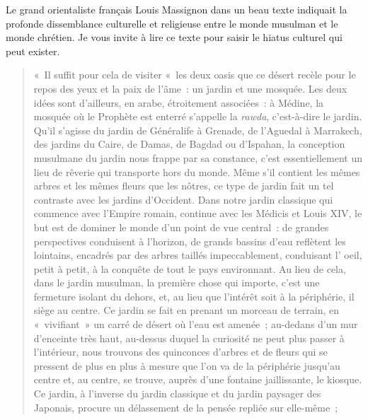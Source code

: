 Le grand orientaliste français Louis Massignon dans un beau texte
indiquait la profonde dissemblance culturelle et religieuse entre le
monde musulman et le monde chrétien. Je vous
invite à lire ce texte pour saisir le hiatus culturel qui peut exister.
\begin{quote}
 «~Il suffit pour cela de visiter «~les deux oasis que ce désert recèle
pour le repos des yeux et la paix de l'âme~: un jardin et une mosquée.
Les deux idées sont d'ailleurs, en arabe, étroitement associées~: à
Médine, la mosquée où le Prophète est enterré s'appelle la \emph{rawda},
c'est-à-dire le jardin. Qu'il s'agisse du jardin de Généralife à
Grenade, de l'Aguedal à Marrakech, des jardins du Caire, de Damas, de
Bagdad ou d'Ispahan, la conception musulmane du jardin nous frappe par
sa constance, c'est essentiellement un lieu de rêverie qui transporte
hors du monde. Même s'il contient les mêmes arbres et les mêmes fleurs
que les nôtres, ce type de jardin fait un tel contraste avec les jardins
d'Occident. Dans notre jardin classique qui commence avec l'Empire
romain, continue avec les Médicis et Louis XIV, le but est de dominer le
monde d'un point de vue central~: de grandes perspectives conduisent à
l'horizon, de grands bassins d'eau reflètent les lointains, encadrés par
des arbres taillés impeccablement, conduisant l' oeil, petit à petit, à la
conquête de tout le pays environnant. Au lieu de cela, dans le jardin
musulman, la première chose qui importe, c'est une fermeture isolant du
dehors, et, au lieu que l'intérêt soit à la périphérie, il siège au
centre. Ce jardin se fait en prenant un morceau de terrain, en
«~vivifiant~» un carré de désert où l'eau est amenée~; au-dedans d'un
mur d'enceinte très haut, au-dessus duquel la curiosité ne peut plus
passer à l'intérieur, nous trouvons des quinconces d'arbres et de fleurs
qui se pressent de plus en plus à mesure que l'on va de la périphérie
jusqu'au centre et, au centre, se trouve, auprès d'une fontaine
jaillissante, le kiosque. Ce jardin, à l'inverse du jardin classique et
du jardin paysager des Japonais, procure un délassement de la pensée
repliée sur elle-même~;   
\end{quote}

